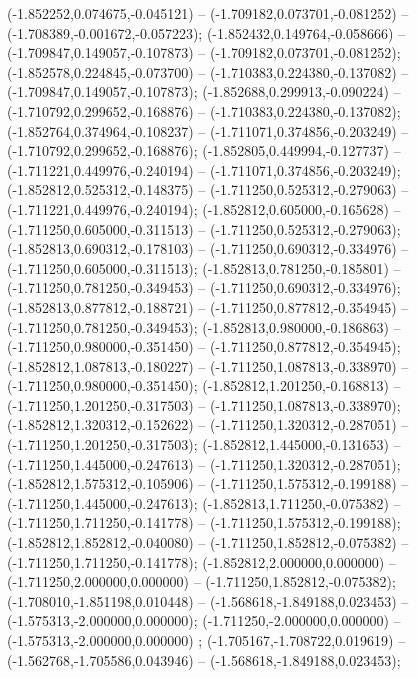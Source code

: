  (-1.852252,0.074675,-0.045121) -- (-1.709182,0.073701,-0.081252) -- (-1.708389,-0.001672,-0.057223);
 (-1.852432,0.149764,-0.058666) -- (-1.709847,0.149057,-0.107873) -- (-1.709182,0.073701,-0.081252);
 (-1.852578,0.224845,-0.073700) -- (-1.710383,0.224380,-0.137082) -- (-1.709847,0.149057,-0.107873);
 (-1.852688,0.299913,-0.090224) -- (-1.710792,0.299652,-0.168876) -- (-1.710383,0.224380,-0.137082);
 (-1.852764,0.374964,-0.108237) -- (-1.711071,0.374856,-0.203249) -- (-1.710792,0.299652,-0.168876);
 (-1.852805,0.449994,-0.127737) -- (-1.711221,0.449976,-0.240194) -- (-1.711071,0.374856,-0.203249);
 (-1.852812,0.525312,-0.148375) -- (-1.711250,0.525312,-0.279063) -- (-1.711221,0.449976,-0.240194);
 (-1.852812,0.605000,-0.165628) -- (-1.711250,0.605000,-0.311513) -- (-1.711250,0.525312,-0.279063);
 (-1.852813,0.690312,-0.178103) -- (-1.711250,0.690312,-0.334976) -- (-1.711250,0.605000,-0.311513);
 (-1.852813,0.781250,-0.185801) -- (-1.711250,0.781250,-0.349453) -- (-1.711250,0.690312,-0.334976);
 (-1.852813,0.877812,-0.188721) -- (-1.711250,0.877812,-0.354945) -- (-1.711250,0.781250,-0.349453);
 (-1.852813,0.980000,-0.186863) -- (-1.711250,0.980000,-0.351450) -- (-1.711250,0.877812,-0.354945);
 (-1.852812,1.087813,-0.180227) -- (-1.711250,1.087813,-0.338970) -- (-1.711250,0.980000,-0.351450);
 (-1.852812,1.201250,-0.168813) -- (-1.711250,1.201250,-0.317503) -- (-1.711250,1.087813,-0.338970);
 (-1.852812,1.320312,-0.152622) -- (-1.711250,1.320312,-0.287051) -- (-1.711250,1.201250,-0.317503);
 (-1.852812,1.445000,-0.131653) -- (-1.711250,1.445000,-0.247613) -- (-1.711250,1.320312,-0.287051);
 (-1.852812,1.575312,-0.105906) -- (-1.711250,1.575312,-0.199188) -- (-1.711250,1.445000,-0.247613);
 (-1.852813,1.711250,-0.075382) -- (-1.711250,1.711250,-0.141778) -- (-1.711250,1.575312,-0.199188);
 (-1.852812,1.852812,-0.040080) -- (-1.711250,1.852812,-0.075382) -- (-1.711250,1.711250,-0.141778);
 (-1.852812,2.000000,0.000000) -- (-1.711250,2.000000,0.000000) -- (-1.711250,1.852812,-0.075382);
 (-1.708010,-1.851198,0.010448) -- (-1.568618,-1.849188,0.023453) -- (-1.575313,-2.000000,0.000000);
 (-1.711250,-2.000000,0.000000) -- (-1.575313,-2.000000,0.000000) ;
 (-1.705167,-1.708722,0.019619) -- (-1.562768,-1.705586,0.043946) -- (-1.568618,-1.849188,0.023453);
